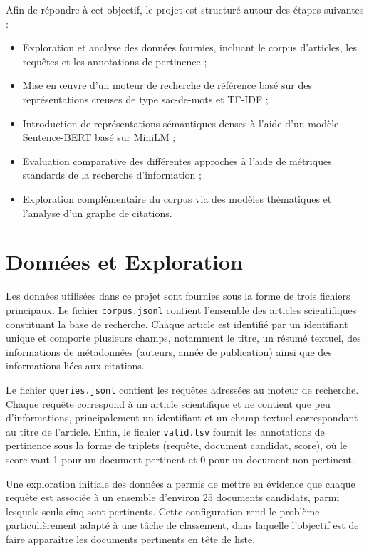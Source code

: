 \documentclass{rapportECL}
\begin{document}
Afin de répondre à cet objectif, le projet est structuré autour des étapes suivantes :
\begin{itemize}
    \item Exploration et analyse des données fournies, incluant le corpus d’articles, les requêtes et les annotations de pertinence ;
    \item Mise en œuvre d’un moteur de recherche de référence basé sur des représentations creuses de type sac-de-mots et TF-IDF ;
    \item Introduction de représentations sémantiques denses à l’aide d’un modèle Sentence-BERT basé sur MiniLM ;
    \item Evaluation comparative des différentes approches à l’aide de métriques standards de la recherche d’information ;
    \item Exploration complémentaire du corpus via des modèles thématiques et l’analyse d’un graphe de citations.
\end{itemize}


\section{Données et Exploration}

Les données utilisées dans ce projet sont fournies sous la forme de trois fichiers principaux. Le fichier \texttt{corpus.jsonl} contient l’ensemble des articles scientifiques constituant la base de recherche. Chaque article est identifié par un identifiant unique et comporte plusieurs champs, notamment le titre, un résumé textuel, des informations de métadonnées (auteurs, année de publication) ainsi que des informations liées aux citations.

Le fichier \texttt{queries.jsonl} contient les requêtes adressées au moteur de recherche. Chaque requête correspond à un article scientifique et ne contient que peu d’informations, principalement un identifiant et un champ textuel correspondant au titre de l’article. Enfin, le fichier \texttt{valid.tsv} fournit les annotations de pertinence sous la forme de triplets (requête, document candidat, score), où le score vaut 1 pour un document pertinent et 0 pour un document non pertinent.

Une exploration initiale des données a permis de mettre en évidence que chaque requête est associée à un ensemble d’environ 25 documents candidats, parmi lesquels seuls cinq sont pertinents. Cette configuration rend le problème particulièrement adapté à une tâche de classement, dans laquelle l’objectif est de faire apparaître les documents pertinents en tête de liste.
\end{document}
